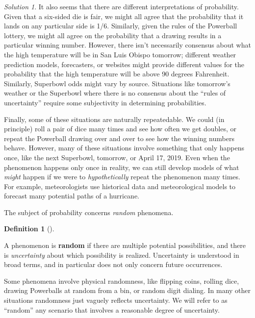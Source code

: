 \documentclass[
  letterpaper,
  DIV=11,
  numbers=noendperiod]{scrreprt}
\theoremstyle{plain}
\theoremstyle{definition}
\theoremstyle{definition}
\theoremstyle{definition}
\newtheorem{definition}{Definition}[chapter]
\theoremstyle{remark}
\newtheorem{refsolution}{Solution}[chapter]
\begin{document}
\begin{tcolorbox}
\begin{refsolution}
It also seems that there are different interpretations of probability.
Given that a six-sided die is fair, we might all agree that the
probability that it lands on any particular side is 1/6. Similarly,
given the rules of the Powerball lottery, we might all agree on the
probability that a drawing results in a particular winning number.
However, there isn't necessarily consensus about what the high
temperature will be in San Luis Obispo tomorrow; different weather
prediction models, forecasters, or websites might provide different
values for the probability that the high temperature will be above 90
degrees Fahrenheit. Similarly, Superbowl odds might vary by source.
Situations like tomorrow's weather or the Superbowl where there is no
consensus about the ``rules of uncertainty'' require some subjectivity
in determining probabilities.

Finally, some of these situations are naturally repeatedable. We could
(in principle) roll a pair of dice many times and see how often we get
doubles, or repeat the Powerball drawing over and over to see how the
winning numbers behave. However, many of these situations involve
something that only happens once, like the next Superbowl, tomorrow, or
April 17, 2019. Even when the phenomenon happens only once in reality,
we can still develop models of what \emph{might} happen if we were to
\emph{hypothetically} repeat the phenomenon many times. For example,
meteorologists use historical data and meteorological models to forecast
many potential paths of a hurricane.

\label{sol-randomness}

\end{refsolution}

\end{tcolorbox}

The subject of probability concerns \emph{random} phenomena.

\begin{definition}[]\protect\hypertarget{def-random}{}\label{def-random}

A phenomenon is \textbf{random} if there are multiple
potential possibilities, and there is \emph{uncertainty} about which
possibility is realized. Uncertainty is understood in broad terms, and
in particular does not only concern future occurrences.

\end{definition}

Some phenomena involve physical randomness, like flipping coins, rolling
dice, drawing Powerballs at random from a bin, or random digit dialing.
In many other situations randomness just vaguely reflects uncertainty.
We will refer to as ``random'' any scenario that involves a reasonable
degree of uncertainty.
\end{document}
